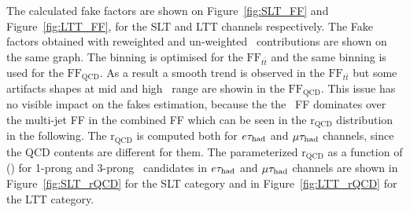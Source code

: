 The calculated fake factors are shown on Figure~\ref{fig:SLT_FF} and Figure~\ref{fig:LTT_FF}, 
for the SLT and LTT channels respectively. 
The Fake factors obtained with reweighted and un-weighted \ttbar\ contributions are shown on the
same graph. 
The binning is optimised for the $\text{FF}_{t\bar{t}}$ and the same binning is used for the 
$\text{FF}_\text{QCD}$. As a result a smooth trend is observed in the $\text{FF}_{t\bar{t}}$ 
but some artifacts shapes at mid and high \pt\ range are showin in the $\text{FF}_\text{QCD}$.
This issue has no visible impact on the fakes estimation, because the 
the \ttbar\ FF dominates over the multi-jet FF in the combined FF which can be seen 
in the $\mathrm{r}_\text{QCD}$ distribution in the following. 
The $\mathrm{r}_{\mathrm{QCD}}$ is computed both for $e\tau_{\mathrm{had}}$ and $\mu\tau_{\mathrm{had}}$ channels, 
since the QCD contents are different for them.
The parameterized $\mathrm{r}_{\mathrm{QCD}}$ 
as a function of \pT(\tauhad) for 1-prong and 3-prong \tauhad\ candidates in $e\tau_{\mathrm{had}}$ and $\mu\tau_{\mathrm{had}}$ channels 
are shown in Figure~\ref{fig:SLT_rQCD} for the SLT category and 
in Figure~\ref{fig:LTT_rQCD} for the LTT category.
 
